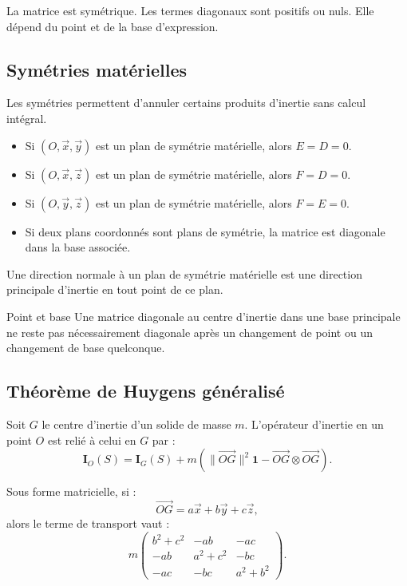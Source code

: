 La matrice est symétrique. Les termes diagonaux sont positifs ou nuls. Elle dépend du point et de la base d'expression.

\subsection{Symétries matérielles}

Les symétries permettent d'annuler certains produits d'inertie sans calcul intégral.

\begin{itemize}
  \item Si $(O,\vec x,\vec y)$ est un plan de symétrie matérielle, alors $E=D=0$.
  \item Si $(O,\vec x,\vec z)$ est un plan de symétrie matérielle, alors $F=D=0$.
  \item Si $(O,\vec y,\vec z)$ est un plan de symétrie matérielle, alors $F=E=0$.
  \item Si deux plans coordonnés sont plans de symétrie, la matrice est diagonale dans la base associée.
\end{itemize}

Une direction normale à un plan de symétrie matérielle est une direction principale d'inertie en tout point de ce plan.

\begin{TLWarning}{Point et base}
Une matrice diagonale au centre d'inertie dans une base principale ne reste pas nécessairement diagonale après un changement de point ou un changement de base quelconque.
\end{TLWarning}

\subsection{Théorème de Huygens généralisé}

Soit $G$ le centre d'inertie d'un solide de masse $m$. L'opérateur d'inertie en un point $O$ est relié à celui en $G$ par :
\[
\mathbf I_O(S)=\mathbf I_G(S)
+m\left(\|\overrightarrow{OG}\|^2\mathbf 1
-\overrightarrow{OG}\otimes\overrightarrow{OG}\right).
\]

Sous forme matricielle, si :
\[
\overrightarrow{OG}=a\vec x+b\vec y+c\vec z,
\]
alors le terme de transport vaut :
\[
m
\begin{pmatrix}
b^2+c^2 & -ab & -ac\\
-ab & a^2+c^2 & -bc\\
-ac & -bc & a^2+b^2
\end{pmatrix}.
\]

